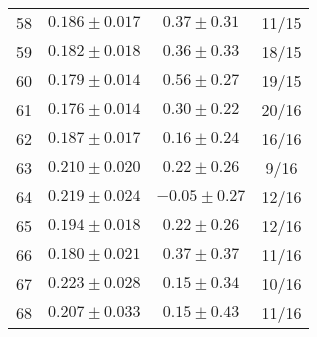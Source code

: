 \begin{tabular}{c|c|c|c}
58 & $0.186\pm0.017$ & $0.37\pm0.31$ & 11/15 \\
59 & $0.182\pm0.018$ & $0.36\pm0.33$ & 18/15 \\
60 & $0.179\pm0.014$ & $0.56\pm0.27$ & 19/15 \\
61 & $0.176\pm0.014$ & $0.30\pm0.22$ & 20/16 \\
62 & $0.187\pm0.017$ & $0.16\pm0.24$ & 16/16 \\
63 & $0.210\pm0.020$ & $0.22\pm0.26$ & 9/16 \\
64 & $0.219\pm0.024$ & $-0.05\pm0.27$ & 12/16 \\
65 & $0.194\pm0.018$ & $0.22\pm0.26$ & 12/16 \\
66 & $0.180\pm0.021$ & $0.37\pm0.37$ & 11/16 \\
67 & $0.223\pm0.028$ & $0.15\pm0.34$ & 10/16 \\
68 & $0.207\pm0.033$ & $0.15\pm0.43$ & 11/16 \\
\end{tabular}
